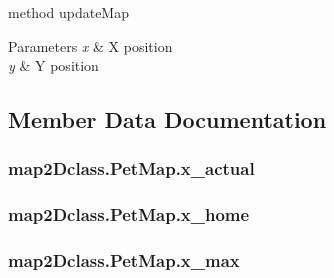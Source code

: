 method update\+Map 


\begin{DoxyParams}{Parameters}
{\em x} & X position \\
\hline
{\em y} & Y position \\
\hline
\end{DoxyParams}


\subsection{Member Data Documentation}
\subsubsection[{\texorpdfstring{x\+\_\+actual}{x_actual}}]{\setlength{\rightskip}{0pt plus 5cm}map2\+Dclass.\+Pet\+Map.\+x\+\_\+actual}\hypertarget{classmap2Dclass_1_1PetMap_a9156cd467e0b7146a0f5e14131101b88}{}\label{classmap2Dclass_1_1PetMap_a9156cd467e0b7146a0f5e14131101b88}
\subsubsection[{\texorpdfstring{x\+\_\+home}{x_home}}]{\setlength{\rightskip}{0pt plus 5cm}map2\+Dclass.\+Pet\+Map.\+x\+\_\+home}\hypertarget{classmap2Dclass_1_1PetMap_a17deee053ed583b3b6ec48e7e3f631df}{}\label{classmap2Dclass_1_1PetMap_a17deee053ed583b3b6ec48e7e3f631df}
\subsubsection[{\texorpdfstring{x\+\_\+max}{x_max}}]{\setlength{\rightskip}{0pt plus 5cm}map2\+Dclass.\+Pet\+Map.\+x\+\_\+max}\hypertarget{classmap2Dclass_1_1PetMap_a0a948618f8974b5ebdac2c1ca24cb8cd}{}\label{classmap2Dclass_1_1PetMap_a0a948618f8974b5ebdac2c1ca24cb8cd}
